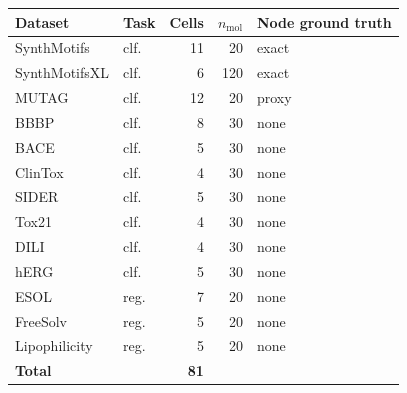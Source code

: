\setlength{\tabcolsep}{3.6pt}
\begin{tabular}{llrrl}
\toprule
Dataset & Task & Cells & $n_{\mathrm{mol}}$ & Node ground truth \\
\midrule
SynthMotifs & clf. & 11 & 20 & exact \\
SynthMotifsXL & clf. & 6 & 120 & exact \\
MUTAG & clf. & 12 & 20 & proxy \\
BBBP & clf. & 8 & 30 & none \\
BACE & clf. & 5 & 30 & none \\
ClinTox & clf. & 4 & 30 & none \\
SIDER & clf. & 5 & 30 & none \\
Tox21 & clf. & 4 & 30 & none \\
DILI & clf. & 4 & 30 & none \\
hERG & clf. & 5 & 30 & none \\
ESOL & reg. & 7 & 20 & none \\
FreeSolv & reg. & 5 & 20 & none \\
Lipophilicity & reg. & 5 & 20 & none \\
\midrule
\textbf{Total} & & \textbf{81} & & \\
\bottomrule
\end{tabular}
